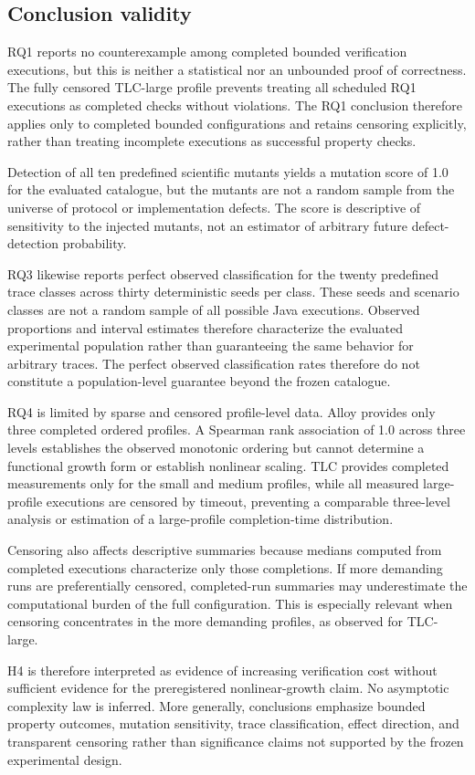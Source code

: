 \subsection{Conclusion validity}
\label{subsec:conclusion-validity}

RQ1 reports no counterexample among completed bounded verification executions,
but this is neither a statistical nor an unbounded proof of correctness. The
fully censored TLC-large profile prevents treating all scheduled RQ1 executions
as completed checks without violations. The RQ1 conclusion therefore applies
only to completed bounded configurations and retains censoring explicitly,
rather than treating incomplete executions as successful property checks.

Detection of all ten predefined scientific mutants yields a mutation score of
1.0 for the evaluated catalogue, but the mutants are not a random sample from
the universe of protocol or implementation defects. The score is descriptive
of sensitivity to the injected mutants, not an estimator of arbitrary future
defect-detection probability.

RQ3 likewise reports perfect observed classification for the twenty predefined
trace classes across thirty deterministic seeds per class. These seeds and
scenario classes are not a random sample of all possible Java executions.
Observed proportions and interval estimates therefore characterize the
evaluated experimental population rather than guaranteeing the same behavior
for arbitrary traces. The perfect observed classification rates therefore do
not constitute a population-level guarantee beyond the frozen catalogue.

RQ4 is limited by sparse and censored profile-level data. Alloy provides only
three completed ordered profiles. A Spearman rank association of 1.0 across
three levels establishes the observed monotonic ordering but cannot determine a
functional growth form or establish nonlinear scaling. TLC provides completed
measurements only for the small and medium profiles, while all measured
large-profile executions are censored by timeout, preventing a comparable
three-level analysis or estimation of a large-profile completion-time
distribution.

Censoring also affects descriptive summaries because medians computed from
completed executions characterize only those completions. If more demanding
runs are preferentially censored, completed-run summaries may underestimate the
computational burden of the full configuration. This is especially relevant
when censoring concentrates in the more demanding profiles, as observed for
TLC-large.

H4 is therefore interpreted as evidence of increasing verification cost
without sufficient evidence for the preregistered nonlinear-growth claim. No
asymptotic complexity law is inferred. More generally, conclusions emphasize
bounded property outcomes, mutation sensitivity, trace classification, effect
direction, and transparent censoring rather than significance claims not
supported by the frozen experimental design.
